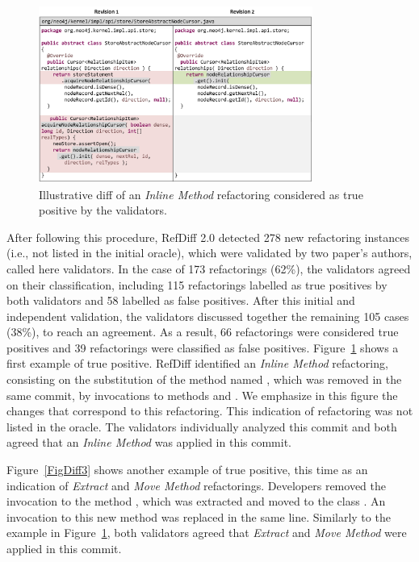 \begin{figure}[!t]
\centering
\includegraphics[width=0.8\textwidth]{img/diff2.pdf}
\caption{Illustrative diff of an \emph{Inline Method} refactoring considered as true positive by the validators.}
\label{FigDiff2}
\end{figure}

After following this procedure, RefDiff 2.0 detected 278 new refactoring instances (i.e., not listed in the initial oracle), which were  validated by two paper's authors, called here validators. In the case of 173 refactorings (62\%), the validators agreed on their classification, including 115 refactorings labelled as true positives by both validators and 58 labelled as false positives. After this initial and independent validation, the validators discussed together the remaining 105 cases (38\%), to reach an agreement. As a result, 66 refactorings were considered true positives and 39 refactorings were classified as false positives. Figure~\ref{FigDiff2} shows a first example of true positive. RefDiff identified an \emph{Inline Method} refactoring, consisting on the substitution of the method named , which was removed in the same commit, by invocations to methods  and . We emphasize in this figure the changes that correspond to this refactoring. This indication of refactoring was not listed in the oracle. The validators individually analyzed this commit and both agreed that an \emph{Inline Method} was applied in this commit.



Figure~\ref{FigDiff3} shows another example of true positive, this time as an indication of \emph{Extract} and \emph{Move Method} refactorings. Developers removed the invocation to the method , which was extracted and moved to the class . An invocation to this new method  was replaced in the same line. Similarly to the example in Figure~\ref{FigDiff2}, both validators agreed that \emph{Extract} and \emph{Move Method} were applied in this commit.

